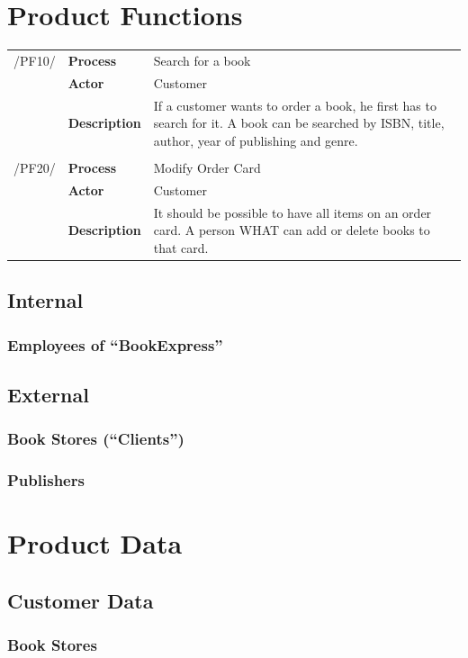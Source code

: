 \documentclass[11pt,a4paper,oneside,svgnames]{report}
\begin{document}
\chapter{Product Functions}
\begin{tabular}{llp{10cm}}
/PF10/	& \textbf{Process}		& Search for a book\\
		& \textbf{Actor}		& Customer\\
		& \textbf{Description}	& If a customer wants to order a book, he first has to search for it. A book can be searched by ISBN, title, author, year of publishing and genre.\\

\hfill \\

/PF20/	& \textbf{Process}		& Modify Order Card\\
		& \textbf{Actor}		& Customer\\
		& \textbf{Description}	& It should be possible to have all items on an order card. A person WHAT can add or delete books to that card.\\
\end{tabular} 

\section{Internal}
\subsection{Employees of ``BookExpress''}

\section{External}
\subsection{Book Stores (``Clients'')}
\subsection{Publishers}

\chapter{Product Data}
\section{Customer Data}
\subsection{Book Stores}
\end{document}
